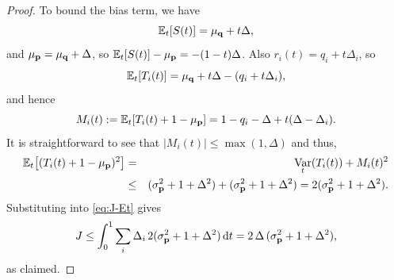 \documentclass[10pt,a4paper]{amsart}
\newcommand{\E}{\mathbb{E}}
\DeclareMathOperator{\Var}{Var}
\newcommand{\beq}{\begin{eqnarray*}}
\newcommand{\eeq}{\end{eqnarray*}}
\renewcommand{\vec}[1]{\textup{{\bf #1}}}
\begin{document}
\begin{proof}
To bound the bias term, we have
\[
  \E_t[S(t)] = \mu_{\vec{q}} + t\Delta,
\]
and $\mu_{\vec{p}}=\mu_{\vec{q}}+\Delta$, so $\E_t[S(t)]-\mu_{\vec{p}}=-(1-t)\Delta$.
Also $r_i(t)=q_i+t\Delta_i$, so
\[
  \E_t[T_i(t)]
  = \mu_{\vec{q}} + t\Delta - (q_i + t\Delta_i),
\]
and hence
\[
  M_i(t) := \E_t[T_i(t)+1-\mu_{\vec{p}}]
  = 1 - q_i - \Delta + t(\Delta-\Delta_i).
\]
It is straightforward to see that
$|M_i(t)| \le \max(1,\Delta)$
and thus,
\beq
  \E_t\bigl[(T_i(t)+1-\mu_{\vec{p}})^2\bigr]
  &=& \Var_t(T_i(t)) + M_i(t)^2
  \\
  &\le&
 (\sigma_{\vec{p}}^2+1+\Delta^2) + (\sigma_{\vec{p}}^2+1+\Delta^2)
  = 2(\sigma_{\vec{p}}^2+1+\Delta^2).
\eeq
Substituting into \eqref{eq:J-Et} gives
\[
  J
  \le \int_0^1 \sum_i \Delta_i\,
         2(\sigma_{\vec{p}}^2+1+\Delta^2)\,\mathrm{d}t
  = 2\,\Delta\,(\sigma_{\vec{p}}^2+1+\Delta^2),
\]
as claimed.
\end{proof}
\end{document}
